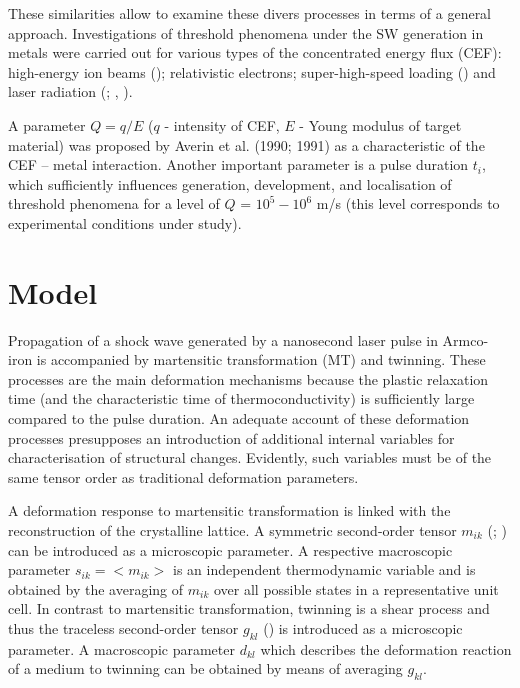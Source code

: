 \documentclass[sw,bibself]{svjour}
\begin{document}
\noindent
These similarities allow to examine these divers processes in terms
of a general approach.
Investigations of threshold phenomena under the SW generation
in metals were carried out for various types of the concentrated
energy flux (CEF): high-energy ion beams (\cite{ref17,ref18});
relativistic electrons; super-high-speed loading (\cite{ref14,ref16})
and laser radiation (\cite{ref15,ref5}; \cite[1984a,\,b]{ref8},
\cite{ref4,ref7,ref6,ref12,ref11}).

A parameter  $Q = q/E$
($q$ - intensity of CEF, $E$ - Young  modulus of
target material) was proposed by Averin et al. (1990; 1991)
as a characteristic of the CEF -- metal interaction.
Another important parameter is a pulse duration $t_{i}$,
which sufficiently influences generation,
development, and localisation of threshold phenomena
for a level of $Q$ = $10^{5} - 10^{6}$ m/s
(this level corresponds to experimental conditions under study).



\section{Model}
Propagation of a shock wave generated by a nanosecond laser pulse in
Armco-iron is accompanied by martensitic transformation (MT) and twinning.
These processes are the main deformation mechanisms because the plastic
relaxation time (and the characteristic time of thermoconductivity) is
sufficiently large compared to the pulse duration.
An adequate account of these deformation processes presupposes
an introduction of additional internal variables for characterisation
of structural changes. Evidently, such variables must be of the same tensor
order as traditional deformation parameters.

A deformation response to martensitic transformation is linked with
the reconstruction of the crystalline lattice. A symmetric second-order
tensor $m_{ik}$ (\cite[1990]{ref21}; \cite{ref23,ref3})
can be introduced as a microscopic parameter.
A respective macroscopic parameter $s_{ik} = \big< m_{ik}\big>$
is an independent thermodynamic variable
and is obtained by the averaging of $m_{ik}$ over all possible states
in a representative unit cell.
In contrast to martensitic transformation, twinning is a shear process
and thus the traceless second-order tensor $g_{kl}$
(\cite{ref20}) is introduced as a microscopic
parameter. A macroscopic parameter $d_{kl}$
which describes the deformation reaction of a medium to twinning can be
obtained by means of averaging $g_{kl}$.
\end{document}
